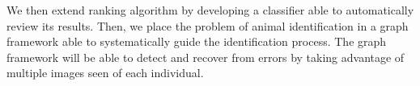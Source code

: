     We then extend ranking algorithm by developing a classifier able to
      automatically review its results.
    Then, we place the problem of animal identification in a graph framework
      able to systematically guide the identification process.
    The graph framework will be able to detect and recover from errors by
      taking advantage of multiple images seen of each individual.
    




